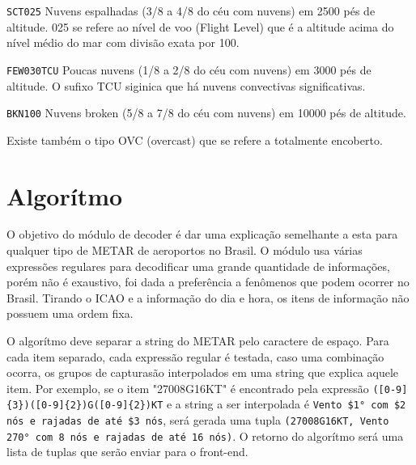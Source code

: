 \texttt{SCT025} Nuvens espalhadas (3/8 a 4/8 do céu com nuvens) em 2500 pés de altitude. 025 se refere ao
nível de voo (Flight Level) que é a altitude acima do nível médio do mar com divisão exata por 100.

\texttt{FEW030TCU} Poucas nuvens (1/8 a 2/8 do céu com nuvens) em 3000 pés de altitude. O sufixo TCU siginica que
há nuvens convectivas significativas. \cite {decea-mil}

\texttt{BKN100} Nuvens broken (5/8 a 7/8 do céu com nuvens) em 10000 pés de altitude.

Existe também o tipo OVC (overcast) que se refere a totalmente encoberto.

\section {Algorítmo}

O objetivo do módulo de decoder é dar uma explicação semelhante a esta para qualquer tipo de METAR
de aeroportos no Brasil. O módulo usa várias expressões regulares para decodificar uma grande quantidade de informações,
porém não é exaustivo, foi dada a preferência a fenômenos que podem ocorrer no Brasil. Tirando o ICAO e a informação
do dia e hora, os itens de informação não possuem uma ordem fixa.

O algorítmo deve separar a string do METAR pelo caractere de espaço. Para cada item separado,
cada expressão regular é testada, caso uma combinação ocorra, os grupos de capturasão interpolados
em uma string que explica aquele item. Por exemplo, se o item "27008G16KT" é encontrado pela
expressão \texttt{([0-9]\{3\})([0-9]\{2\})G([0-9]\{2\})KT} e a string a ser interpolada é
\texttt{Vento \$1° com \$2 nós e rajadas de até \$3 nós}, será gerada uma tupla
\texttt{(27008G16KT, Vento 270° com 8 nós e rajadas de até 16 nós)}. O retorno do 
algorítmo será uma lista de tuplas que serão enviar para o front-end.